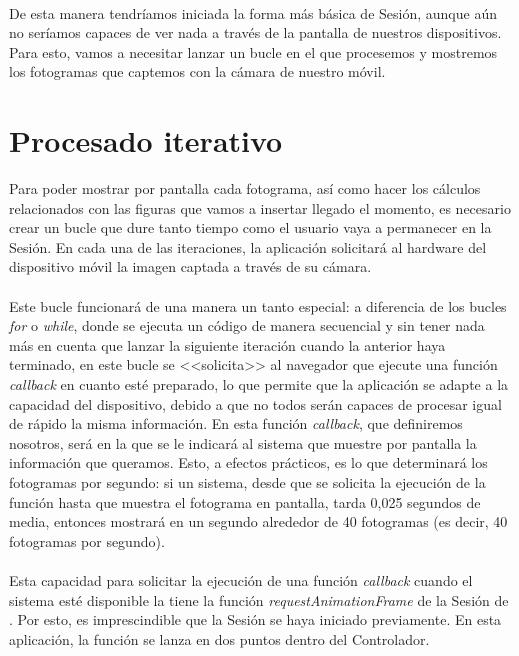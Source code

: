\documentclass{subfiles}
\begin{document}
        \paragraph{}
        De esta manera tendríamos iniciada la forma más básica de Sesión, aunque aún no seríamos capaces de ver nada a través de la pantalla de nuestros dispositivos. Para esto, vamos a necesitar lanzar un bucle en el que procesemos y mostremos los fotogramas que captemos con la cámara de nuestro móvil.
        
        \section{Procesado iterativo}
        \label{sec:2.3}

        Para poder mostrar por pantalla cada fotograma, así como hacer los cálculos relacionados con las figuras que vamos a insertar llegado el momento, es necesario crear un bucle que dure tanto tiempo como el usuario vaya a permanecer en la Sesión. En cada una de las iteraciones, la aplicación solicitará al hardware del dispositivo móvil la imagen captada a través de su cámara.

        \paragraph{}
        Este bucle funcionará de una manera un tanto especial: a diferencia de los bucles \textit{for} o \textit{while}, donde se ejecuta un código de manera secuencial y sin tener nada más en cuenta que lanzar la siguiente iteración cuando la anterior haya terminado, en este bucle se <<solicita>> al navegador que ejecute una función \textit{callback} en cuanto esté preparado, lo que permite que la aplicación se adapte a la capacidad del dispositivo, debido a que no todos serán capaces de procesar igual de rápido la misma información. En esta función \textit{callback}, que definiremos nosotros, será en la que se le indicará al sistema que muestre por pantalla la información que queramos. Esto, a efectos prácticos, es lo que determinará los fotogramas por segundo: si un sistema, desde que se solicita la ejecución de la función hasta que muestra el fotograma en pantalla, tarda 0,025 segundos de media, entonces mostrará en un segundo alrededor de 40 fotogramas (es decir, 40 fotogramas por segundo).

        \paragraph{}
        Esta capacidad para solicitar la ejecución de una función \textit{callback} cuando el sistema esté disponible la tiene la función \textit{requestAnimationFrame} de la Sesión de \webxr \cite{web:requestanimationframe}. Por esto, es imprescindible que la Sesión se haya iniciado previamente. En esta aplicación, la función se lanza en dos puntos dentro del Controlador.
\end{document}
